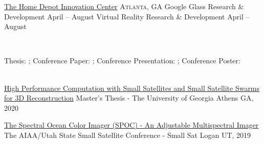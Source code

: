\documentclass[10pt,a4paper]{article}
\begin{document}
\headedsection  %
  {\href{}{The Home Depot Innovation Center}}
  {\textsc{Atlanta, GA}} {%
  \headedsubsection
    {Google Glass Research \& Development}
    {April  -- August }
    {}
  \headedsubsection
    {Virtual Reality Research \& Development}
    {April  -- August }
    {}
}



\spacedhrule{0.5em}{-0.4em}
\vspace{-0.2em}
~\\
\centerline{
Thesis: {\color{bluegreen} \faFileTextO} ; \hspace{2mm} Conference Paper: {\color{bluegreen} \faStickyNoteO} ; \hspace{2mm}
Conference Presentation: {\color{bluegreen} \faTelevision} ; \hspace{2mm} Conference Poster: {\color{bluegreen} \faMapO}
}
\\

\headedsection
  {{\color{bluegreen} \faFileTextO} \href{http://piepieninja.github.io/research-papers/thesis-pre-release.pdf}{High Performance Computation with Small Satellites and Small Satellite Swarms for 3D Reconstruction}}{%
  \headedsubsection
    {Master's Thesis - The University of Georgia}
    {Athens GA, 2020}
    {}
}

\headedsection
  {{\color{bluegreen} \faStickyNoteO} \href{http://smallsat.uga.edu/images/documents/papers/david_smallsat_2019_paper.pdf}{The Spectral Ocean Color Imager (SPOC) - An Adjustable Multispectral Imager}}{%
  \headedsubsection
    {The AIAA/Utah State Small Satellite Conference - Small Sat}
    {Logan UT, 2019}
    {}
}
\end{document}
